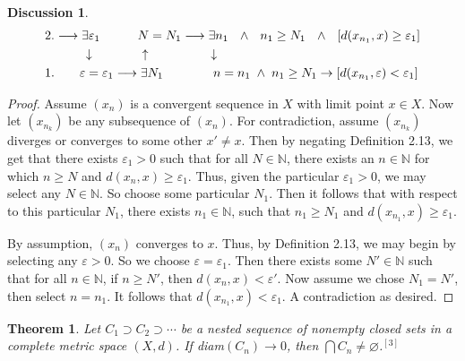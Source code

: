 \documentclass{article}
\newtheorem{theorem}{Theorem}[section]
\theoremstyle{definition}
\theoremstyle{remark}
\theoremstyle{definition}
\newtheorem*{discussion}{Discussion}
\begin{document}
\begin{discussion}
    \begin{align*}
        &2.\longrightarrow\exists\varepsilon_1\quad\quad\quad N=N_1\longrightarrow\exists n_1\text{\hspace{2.5mm}}\wedge\text{\hspace{2.5mm}} n_1\geq N_1\text{\hspace{2.5mm}}\wedge\text{\hspace{2.5mm}}[d(x_{n_1},x)\geq\varepsilon_1] \\
        &\quad\quad\quad\downarrow\quad\quad\quad\quad\uparrow\quad\quad\quad\quad\quad\downarrow \\
        &1.\quad\quad\varepsilon=\varepsilon_1\longrightarrow\exists N_1\quad\quad\quad\quad n=n_1\text{\hspace{1mm}}\wedge\text{\hspace{1mm}} n_1\geq N_1\rightarrow[d(x_{n_1},\varepsilon)<\varepsilon_1]
    \end{align*}
\end{discussion}

\begin{proof}
    Assume $(x_n)$ is a convergent sequence in $X$ with limit point $x\in X$. Now let $(x_{n_k})$ be any subsequence of $(x_n)$. For contradiction, assume $(x_{n_k})$ diverges or converges to some other $x'\neq x$. Then by negating Definition 2.13, we get that there exists $\varepsilon_1>0$ such that for all $N\in\mathbb{N}$, there exists an $n\in\mathbb{N}$ for which $n\geq N$ and $d(x_{n},x)\geq\varepsilon_1$. Thus, given the particular $\varepsilon_1>0$, we may select any $N\in\mathbb{N}$. So choose some particular $N_1$. Then it follows that with respect to this particular $N_1$, there exists $n_1\in\mathbb{N}$, such that $n_1\geq N_1$ and $d(x_{n_1},x)\geq\varepsilon_1$. \par 
    By assumption, $(x_n)$ converges to $x$. Thus, by Definition 2.13, we may begin by selecting any $\varepsilon>0$. So we choose $\varepsilon=\varepsilon_1$. Then there exists some $N'\in\mathbb{N}$ such that for all $n\in\mathbb{N}$, if $n\geq N'$, then $d(x_n,x)<\varepsilon'$. Now assume we chose $N_1=N'$, then select $n=n_1$. It follows that $d(x_{n_1}, x)<\varepsilon_1$. A contradiction as desired. 
\end{proof}

\begin{theorem}
    Let $C_1\supset C_2\supset\cdots$ be a nested sequence of nonempty closed sets in a complete metric space $(X,d)$. If diam$(C_n)\rightarrow 0$, then $\bigcap C_n\neq\varnothing$.$^{[3]}$
\end{theorem}
\end{document}
